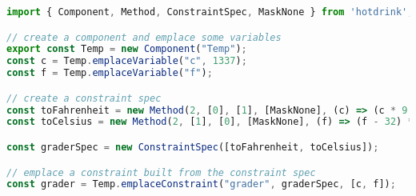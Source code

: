 \begin{lstlisting}[caption={Example of how to use the HotDrink \gls{api} to simulate the corranltion between fahrenheit and celsius},label=hotdrinkapi, language=JavaScript]
import { Component, Method, ConstraintSpec, MaskNone } from 'hotdrink';

// create a component and emplace some variables
export const Temp = new Component("Temp");
const c = Temp.emplaceVariable("c", 1337);
const f = Temp.emplaceVariable("f");

// create a constraint spec
const toFahrenheit = new Method(2, [0], [1], [MaskNone], (c) => (c * 9 / 5 + 32));
const toCelsius = new Method(2, [1], [0], [MaskNone], (f) => (f - 32) * 5 / 9);

const graderSpec = new ConstraintSpec([toFahrenheit, toCelsius]);

// emplace a constraint built from the constraint spec
const grader = Temp.emplaceConstraint("grader", graderSpec, [c, f]);
\end{lstlisting}

